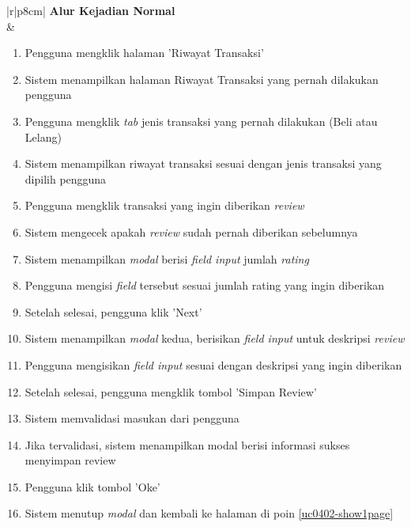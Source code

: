 \begin{table}[H]
\begin{tabular}{|r|p{8cm}|}
			{\textbf{Alur Kejadian Normal}}                                                                            
			\\ \hline
			 & 
			\begin{enumerate}
				\item Pengguna mengklik halaman 'Riwayat Transaksi'
				\item Sistem menampilkan halaman Riwayat Transaksi yang pernah dilakukan pengguna
				\item Pengguna mengklik \textit{tab} jenis transaksi yang pernah dilakukan (Beli atau Lelang)
				\item \label{uc0402-show1page}Sistem menampilkan riwayat transaksi sesuai dengan jenis transaksi yang dipilih pengguna
				\item Pengguna mengklik transaksi yang ingin diberikan \textit{review}
				\item \label{al-0402-a}Sistem mengecek apakah \textit{review} sudah pernah diberikan sebelumnya
				\item Sistem menampilkan \textit{modal} berisi \textit{field input} jumlah \textit{rating}
				\item Pengguna mengisi \textit{field} tersebut sesuai jumlah rating yang ingin diberikan
				\item Setelah selesai, pengguna klik 'Next'
				\item Sistem menampilkan \textit{modal} kedua, berisikan \textit{field input} untuk deskripsi \textit{review}
				\item Pengguna mengisikan \textit{field input} sesuai dengan deskripsi yang ingin diberikan
				\item Setelah selesai, pengguna mengklik tombol 'Simpan Review'
				\item \label{al-0402-b}Sistem memvalidasi masukan dari pengguna
				\item Jika tervalidasi, sistem menampilkan modal berisi informasi sukses menyimpan review
				\item Pengguna klik tombol 'Oke'
				\item Sistem menutup \textit{modal} dan kembali ke halaman di poin \cref{uc0402-show1page}
				

\end{enumerate}
\end{tabular}
\end{table}
